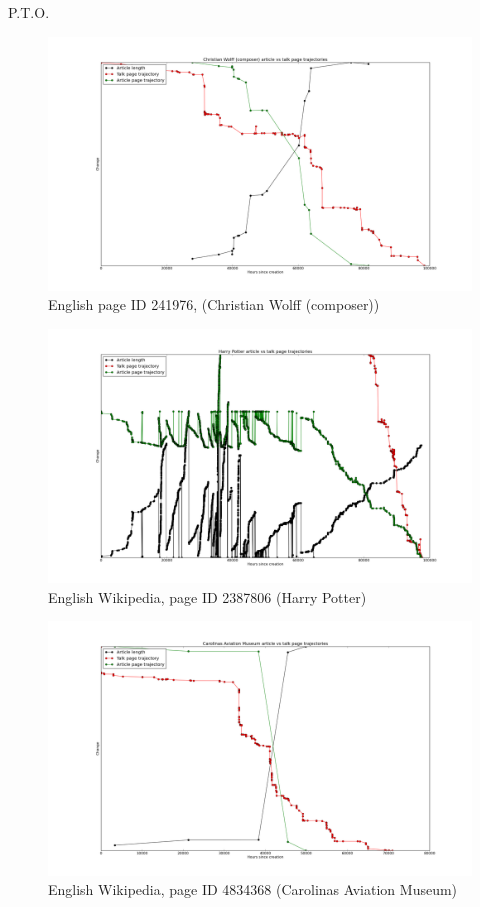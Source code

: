 P.T.O.
\clearpage
\begin{figure}
  \centering
  \includegraphics[width=\linewidth]{img/specialcombo/en241976.png}
    \caption{English page ID 241976, (Christian Wolff (composer))}
\end{figure}
\begin{figure}
  \centering
  \includegraphics[width=\linewidth]{img/specialcombo/en2387806.png}
  \caption{English Wikipedia, page ID 2387806 (Harry Potter)}
\end{figure}
\begin{figure}
  \centering
  \includegraphics[width=\linewidth]{img/specialcombo/en4834368.png}
  \caption{English Wikipedia, page ID 4834368 (Carolinas Aviation Museum)}
\end{figure}
